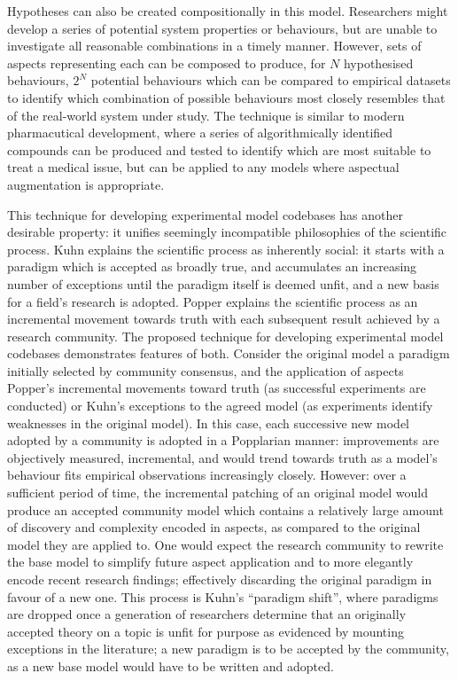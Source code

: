 Hypotheses can also be created compositionally in this model. Researchers might
develop a series of potential system properties or behaviours, but are unable to
investigate all reasonable combinations in a timely manner. However, sets of
aspects representing each can be composed to produce, for $N$ hypothesised
behaviours, $2^N$ potential behaviours which can be compared to empirical
datasets to identify which combination of possible behaviours most closely
resembles that of the real-world system under study. The technique is similar to
modern pharmacutical development, where a series of algorithmically identified
compounds can be produced and tested to identify which are most suitable to
treat a medical issue, but can be applied to any models where aspectual augmentation
is appropriate.

This technique for developing experimental model codebases has another desirable
property: it unifies seemingly incompatible philosophies of the scientific
process. Kuhn explains the scientific
process as inherently social: it starts with a paradigm which is accepted as
broadly true, and accumulates an increasing number of exceptions until the
paradigm itself is deemed unfit, and a new basis for a field's research is
adopted. Popper explains the
scientific process as an incremental movement towards truth with each subsequent
result achieved by a research community. The proposed technique for developing
experimental model codebases demonstrates features of both. Consider the
original model a paradigm initially selected by community consensus, and the
application of aspects Popper's incremental movements toward truth (as
successful experiments are conducted) or Kuhn's exceptions to the agreed model
(as experiments identify weaknesses in the original model). In this case, each
successive new model adopted by a community is adopted in a Popplarian manner:
improvements are objectively measured, incremental, and would trend towards
truth as a model's behaviour fits empirical observations increasingly closely.
However: over a sufficient period of time, the incremental patching of an
original model would produce an accepted community model which contains a
relatively large amount of discovery and complexity encoded in aspects, as
compared to the original model they are applied to. One would expect the
research community to rewrite the base model to simplify future aspect
application and to more elegantly encode recent research findings; effectively
discarding the original paradigm in favour of a new one. This process is Kuhn's
``paradigm shift'', where paradigms are dropped once a generation of researchers
determine that an originally accepted theory on a topic is unfit for purpose as
evidenced by mounting exceptions in the literature; a new paradigm is to be
accepted by the community, as a new base model would have to be written and
adopted. 

